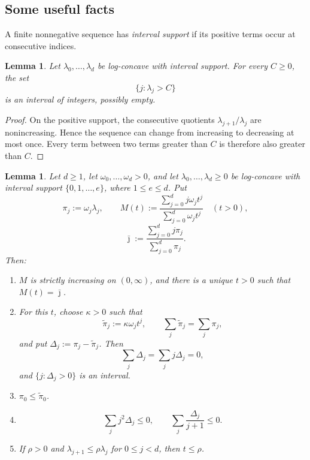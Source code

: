 \documentclass[12pt]{amsart}
\theoremstyle{plain}
\newtheorem{lemma}[theorem]{Lemma}
\theoremstyle{definition}
\theoremstyle{remark}
\begin{document}
\subsection{Some useful facts}

A finite nonnegative sequence has \emph{interval support} if its positive
terms occur at consecutive indices.

\begin{lemma}\label{lem:superlevel-interval}
Let \(\lambda_0,\ldots,\lambda_d\) be log-concave with interval support.
For every \(C\ge0\), the set
\[
 \{j:\lambda_j>C\}
\]
is an interval of integers, possibly empty.
\end{lemma}

\begin{proof}
On the positive support, the consecutive quotients
\(\lambda_{j+1}/\lambda_j\) are nonincreasing.  Hence the sequence can
change from increasing to decreasing at most once.  Every term between
two terms greater than \(C\) is therefore also greater than \(C\).
\end{proof}

\begin{lemma}\label{lem:crossing}
Let \(d\ge1\), let \(\omega_0,\ldots,\omega_d>0\), and let
\(\lambda_0,\ldots,\lambda_d\ge0\) be log-concave with interval support
\(\{0,1,\ldots,e\}\), where \(1\le e\le d\).  Put
\[
 \pi_j:=\omega_j\lambda_j,
 \qquad
 M(t):=
 \frac{\sum_{j=0}^d j\omega_jt^j}
      {\sum_{j=0}^d\omega_jt^j}
 \quad(t>0),
\]
\[
 \bar\jmath:=
 \frac{\sum_{j=0}^d j\pi_j}
      {\sum_{j=0}^d\pi_j}.
\]
Then:
\begin{enumerate}[label=\textup{(\alph*)}]
\item \(M\) is strictly increasing on \((0,\infty)\), and there is a
      unique \(t>0\) such that \(M(t)=\bar\jmath\).
\item For this \(t\), choose \(\kappa>0\) such that
      \[
       \widetilde\pi_j:=\kappa\omega_jt^j,
       \qquad
       \sum_j\widetilde\pi_j=\sum_j\pi_j,
      \]
      and put \(\Delta_j:=\pi_j-\widetilde\pi_j\).  Then
      \[
       \sum_j\Delta_j=\sum_jj\Delta_j=0,
      \]
      and \(\{j:\Delta_j>0\}\) is an interval.
\item \(\pi_0\le\widetilde\pi_0\).
\item
      \[
       \sum_jj^2\Delta_j\le0,
       \qquad
       \sum_j\frac{\Delta_j}{j+1}\le0.
      \]
\item If \(\rho>0\) and
      \(\lambda_{j+1}\le\rho\lambda_j\) for \(0\le j<d\), then
      \(t\le\rho\).
\end{enumerate}
\end{lemma}
\end{document}
